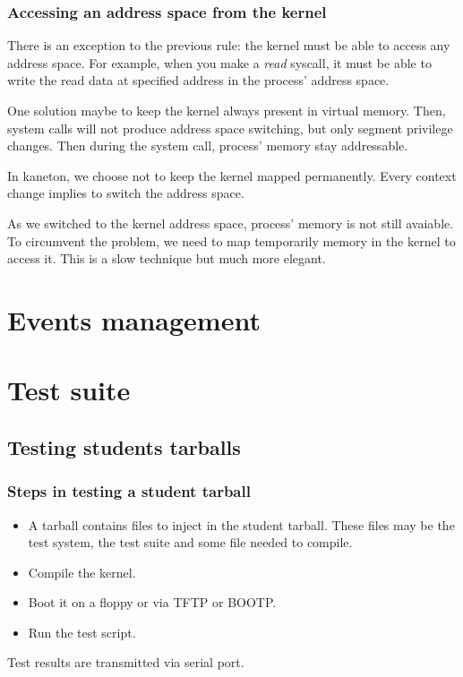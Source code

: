
\begin{frame}
  \frametitle{Accessing an address space from the kernel}

  There is an exception to the  previous rule: the kernel must be able
  to  access  any  address  space.   For  example,  when  you  make  a
  \emph{read}  syscall, it  must be  able to  write the  read  data at
  specified address in the process' address space.

  \nl

  One  solution maybe  to keep  the kernel  always present  in virtual
  memory. Then, system calls will not produce address space switching,
  but  only segment privilege  changes. Then  during the  system call,
  process' memory stay addressable.

  \nl

  In   kaneton,   we   choose   not   to  keep   the   kernel   mapped
  permanently.  Every context  change  implies to  switch the  address
  space.

  \nl

  As we switched  to the kernel address space,  process' memory is not
  still  avaiable.   To  circumvent  the  problem,  we   need  to  map
  temporarily  memory in  the  kernel to  access  it. This  is a  slow
  technique but much more elegant.
\end{frame}

%
%

\section{Events management}

%
%

\section{Test suite}

%
%

\subsection{Testing students tarballs}


\begin{frame}
  \frametitle{Steps in testing a student tarball}

  \begin{itemize}
  \item A tarball contains files to inject in the student tarball. These files may be the test system, the test suite and some file needed to compile.
  \item Compile the kernel.
  \item Boot it on a floppy or via TFTP or BOOTP.
  \item Run the test script.
  \end{itemize}

  \nl

  Test results are transmitted via serial port.

\end{frame}

